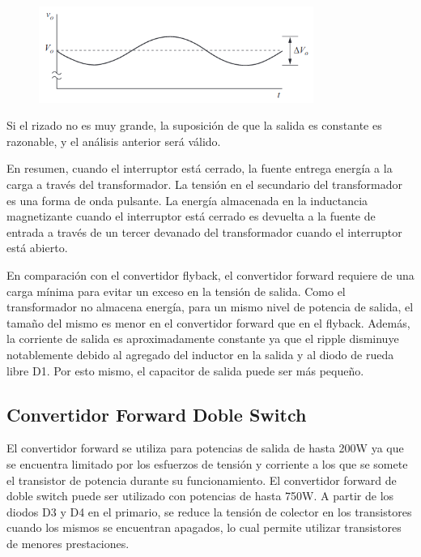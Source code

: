 \begin{figure}[ht]
    \centering
    \includegraphics[width=0.8\textwidth]{../images/hart/buck_converter_capacitor_ripple_voltage.png}
    \caption{}
    \label{fig:buck_converter_capacitor_ripple_voltage}
\end{figure}

Si el rizado no es muy grande, la suposición de que la salida es constante es razonable, y el
análisis anterior será válido.


En resumen, cuando el interruptor está cerrado, la fuente entrega energía a la carga a través del transformador.
La tensión en el secundario del transformador es una forma de onda pulsante. La energía almacenada en
la inductancia magnetizante cuando el interruptor está cerrado es devuelta a la fuente de
entrada a través de un tercer devanado del transformador cuando el interruptor está abierto.

En comparación con el convertidor flyback, el convertidor forward requiere de una carga mínima para evitar un exceso en la tensión de salida. 
Como el transformador no almacena energía, para un mismo nivel de potencia de salida, 
el tamaño del mismo es menor en el convertidor forward que en el flyback. 
Además, la corriente de salida es aproximadamente constante ya que el ripple disminuye notablemente 
debido al agregado del inductor en la salida y al diodo de rueda libre D1.
Por esto mismo, el capacitor de salida puede ser más pequeño. 

\subsection{Convertidor Forward Doble Switch}

El convertidor forward se utiliza para potencias de salida de hasta 200W ya que se encuentra limitado 
por los esfuerzos de tensión y corriente a los que se somete el transistor de potencia durante su funcionamiento. 
El convertidor forward de doble switch puede ser utilizado con potencias de hasta 750W. 
A partir de los diodos D3 y D4 en el primario, se reduce la tensión de colector en los transistores cuando los mismos 
se encuentran apagados, lo cual permite utilizar transistores de menores prestaciones.


